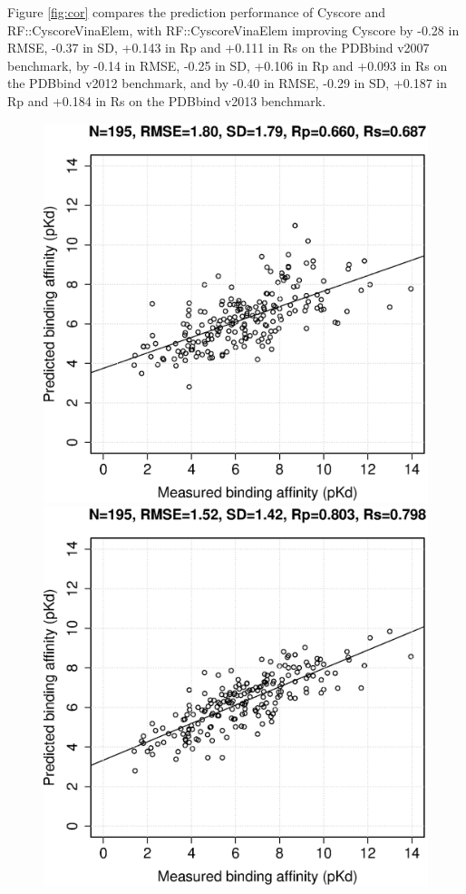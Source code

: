 \documentclass[journal=jacsat,manuscript=article]{achemso}
\begin{document}
Figure \ref{fig:cor} compares the prediction performance of Cyscore and RF::CyscoreVinaElem, with RF::CyscoreVinaElem improving Cyscore by -0.28 in RMSE, -0.37 in SD, +0.143 in Rp and +0.111 in Rs on the PDBbind v2007 benchmark, by -0.14 in RMSE, -0.25 in SD, +0.106 in Rp and +0.093 in Rs on the PDBbind v2012 benchmark, and by -0.40 in RMSE, -0.29 in SD, +0.187 in Rp and +0.184 in Rs on the PDBbind v2013 benchmark.

\begin{figure}[h!]
\includegraphics[width=\linewidth]{../rfcyscore/x4/mlr/trn-247-tst-195-yp.eps}
\endminipage
{}
\includegraphics[width=\linewidth]{../rfcyscore/x46/rf/trn-1105-tst-195-yp.eps}

\end{figure}
\end{document}

